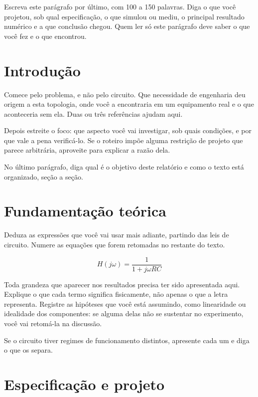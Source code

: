 \documentclass[11pt,a4paper]{article}
\begin{document}
\capa

\begin{resumo}
Escreva este parágrafo por último, com 100 a 150 palavras. Diga o que você projetou, sob
qual especificação, o que simulou ou mediu, o principal resultado numérico e a que
conclusão chegou. Quem ler só este parágrafo deve saber o que você fez e o que encontrou.
\end{resumo}

\section{Introdução}

Comece pelo problema, e não pelo circuito. Que necessidade de engenharia deu origem a esta
topologia, onde você a encontraria em um equipamento real e o que aconteceria sem ela. Duas
ou três referências ajudam aqui.

Depois estreite o foco: que aspecto você vai investigar, sob quais condições, e por que
vale a pena verificá-lo. Se o roteiro impõe alguma restrição de projeto que parece
arbitrária, aproveite para explicar a razão dela.

No último parágrafo, diga qual é o objetivo deste relatório e como o texto está
organizado, seção a seção.

\section{Fundamentação teórica}

Deduza as expressões que você vai usar mais adiante, partindo das leis de circuito.
Numere as equações que forem retomadas no restante do texto.

\begin{equation}
H(j\omega) = \frac{1}{1+j\omega RC}
\label{eq:exemplo}
\end{equation}

Toda grandeza que aparecer nos resultados precisa ter sido apresentada aqui. Explique o que
cada termo significa fisicamente, não apenas o que a letra representa. Registre as hipóteses
que você está assumindo, como linearidade ou idealidade dos componentes: se alguma delas
não se sustentar no experimento, você vai retomá-la na discussão.

Se o circuito tiver regimes de funcionamento distintos, apresente cada um e diga o que os
separa.

\section{Especificação e projeto}
\end{document}

